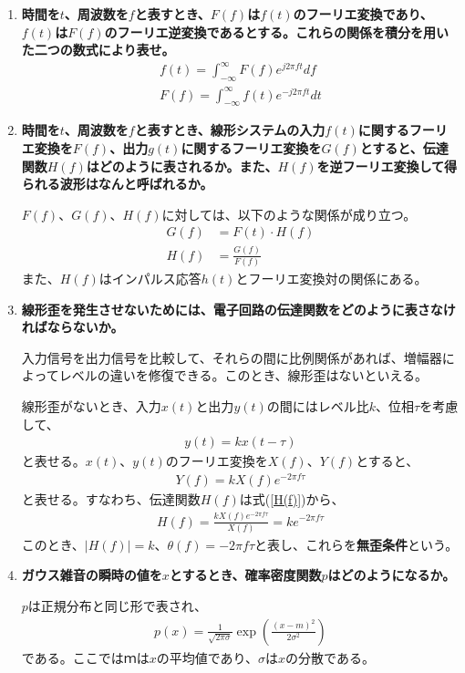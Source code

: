 \documentclass[10pt]{jsarticle}
\begin{document}
\begin{enumerate}
\item\textbf{時間を$t$、周波数を$f$と表すとき、$F(f)$は$f(t)$のフーリエ変換であり、$f(t)$は$F(f)$のフーリエ逆変換であるとする。これらの関係を積分を用いた二つの数式により表せ。}
\begin{align}
f(t)=\int_{-\infty}^\infty F(f)e^{j2\pi ft} df\\
F(f)=\int_{-\infty}^\infty f(t)e^{-j2\pi ft} dt
\end{align}

\item\textbf{時間を$t$、周波数を$f$と表すとき、線形システムの入力$f(t)$に関するフーリエ変換を$F(f)$、出力$g(t)$に関するフーリエ変換を$G(f)$とすると、伝達関数$H(f)$はどのように表されるか。また、$H(f)$を逆フーリエ変換して得られる波形はなんと呼ばれるか。}

$F(f)$、$G(f)$、$H(f)$に対しては、以下のような関係が成り立つ。
\begin{align}
G(f)&=F(t) \cdot H(f)\\
H(f)&=\frac{G(f)}{F(f)} \label{H(f)}
\end{align}
また、$H(f)$はインパルス応答$h(t)$とフーリエ変換対の関係にある。


\item\textbf{線形歪を発生させないためには、電子回路の伝達関数をどのように表さなければならないか。}

入力信号を出力信号を比較して、それらの間に比例関係があれば、増幅器によってレベルの違いを修復できる。このとき、線形歪はないといえる。

線形歪がないとき、入力$x(t)$と出力$y(t)$の間にはレベル比$k$、位相$\tau$を考慮して、
\begin{align}
y(t)=kx(t-\tau)
\end{align}
と表せる。$x(t)$、$y(t)$のフーリエ変換を$X(f)$、$Y(f)$とすると、
\begin{align}
Y(f)=kX(f)e^{-2\pi f \tau}
\end{align}
と表せる。すなわち、伝達関数$H(f)$は式(\ref{H(f)})から、
\begin{align}
H(f)=\frac{kX(f)e^{-2\pi f \tau}}{X(f)}=ke^{-2\pi f \tau}
\end{align}
このとき、$|H(f)|=k$、$\theta (f) = -2\pi f \tau$と表し、これらを\textbf{無歪条件}という。

\item\textbf{ガウス雑音の瞬時の値を$x$とするとき、確率密度関数$p$はどのようになるか。}

$p$は正規分布と同じ形で表され、
\begin{align}
p(x)=\frac{1}{\sqrt{2 \pi \sigma}}\exp({\frac{(x-m)^2}{2\sigma^2}})
\end{align}
である。ここでは$ｍ$は$x$の平均値であり、$\sigma$は$x$の分散である。


\end{enumerate}
\end{document}

